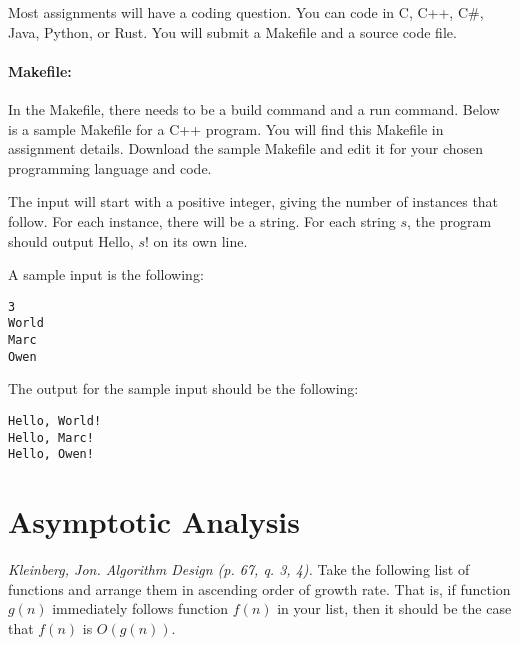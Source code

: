 \documentclass[solutionorbox,answers]{exam}
\begin{document}
\begin{questions}
Most assignments will have a coding question. You can code in C, C++, C\#, Java, Python, or Rust. You will submit a Makefile and a source code file.
\vspace{-0.5cm}

\paragraph{Makefile:} In the Makefile, there needs to be a build command and a run command. Below is a sample Makefile for a C++ program. You will find this Makefile in assignment details. Download the sample Makefile and edit it for your chosen programming language and code.



\newpage
{}

The input will start with a positive integer, giving the number of instances that follow. For each instance, there will be a string. For each string $s$, the program should output Hello, $s$! on its own line.

A sample input is the following:
\begin{verbatim}
3
World
Marc
Owen
\end{verbatim}

The output for the sample input should be the following:
\begin{verbatim}
Hello, World!
Hello, Marc!
Hello, Owen!
\end{verbatim}

\section*{Asymptotic Analysis}

  \question \textit{Kleinberg, Jon. Algorithm Design (p. 67, q. 3, 4).} Take the following list of functions and arrange them in ascending order of growth rate. That is, if function $g(n)$ immediately follows function $f(n)$ in your list, then it should be the case that $f(n)$ is $O(g(n))$. 

\end{questions}
\end{document}
